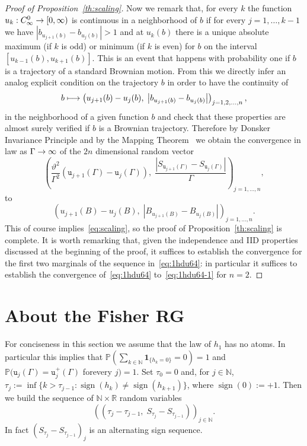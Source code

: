 \documentclass[AHL,Unicode,longabstracts,published]{cedram}
\newcommand{\ind}{\mathbf{1}}
\newcommand{\bbN}{\mathbb{N}}
\newcommand{\bbP}{\mathbb{P}}
\newcommand{\bbR}{\mathbb{R}}
\newcommand{\gG}{\Gamma}
\renewcommand*\ss{\mathtt{u}}
\newcommand{\tu}{\ss}
\newcommand{\tuplus}{\ss^+}
\DeclareMathOperator{\sign}{\mathrm{sign}}
\renewcommand*{\to}{\mathchoice{\longrightarrow}{\rightarrow}{\rightarrow}{\rightarrow}}
\let\oldmapsto\mapsto
\renewcommand*{\mapsto}{\mathchoice{\longmapsto}{\oldmapsto}{\oldmapsto}{\oldmapsto}}
\begin{document}
\begin{proof}[Proof of Proposition~\ref{th:scaling}]
Now we remark that, for every $k$ the function $u_k: C^0_\infty \to [0, \infty)$ is continuous in a neighborhood of $b$ if for every $j=1,\dots, k-1$ we have $| b_{u_{j+1}(b)}- b_{u_j (b)}| >1$ and at $u_k(b)$ there is a unique absolute maximum (if $k$ is odd) or minimum (if $k$ is even) for $b$ on the interval $[u_{k-1}(b), u_{k+1}(b)]$. This is an event that happens with probability one if $b$ is a trajectory of a standard Brownian motion. From this we directly infer an analog explicit condition on the trajectory $b$ in order to have the continuity of
\begin{equation}
b \mapsto
\left(u_{j+1}(b)-u_j(b),\; \left | b_{u_{j+1}(b)}-b_{u_{j}(b)}\right | \right)_{j=1,2, \dots, n},
\end{equation}
in the neighborhood of a given function $b$ and check that these properties are almost surely verified if $b$ is a Brownian trajectory. Therefore by {Donsker Invariance Principle} and by the {Mapping Theorem}~\cite[Theorem~2.7, Chapter~1]{cf:Bill} we obtain the convergence in law as $\gG\to \infty$ of the $2n$ dimensional random vector
\begin{equation}\label{eq:1hdu64}
\left(\frac{\vartheta^2}{ \gG ^2}\left(\tu_{j+1}(\gG) - \tu_j(\gG)\right), \;\frac{\left|S_{\tu_{j+1}(\gG)} - S_{\tu_j(\gG)}\right| }{ \gG }\right)_{j=1, \dots, n}
,
\end{equation}
to
\begin{equation}\label{eq:1hdu64-1}
\left(u_{j+1}(B)-u_j(B),\; \left|B_{u_{j+1}(B)}-B_{u_{j}(B)}\right|\right)_{j=1, \dots, n}.
\end{equation}
This of course implies~\eqref{eq:scaling}, so the proof of Proposition~\ref{th:scaling} is complete. It is worth remarking that, given the independence and IID properties discussed at the beginning of the proof, it suffices to establish the convergence for the first two marginals of the sequence in~\eqref{eq:1hdu64}: in particular it suffices to establish the convergence of~\eqref{eq:1hdu64} to~\eqref{eq:1hdu64-1} for $n=2$.
\end{proof}

\section{About the Fisher RG}\label{sec:RG}

For conciseness in this section we assume that the law of $h_1$ has no atoms. In particular this implies that $\bbP(\sum_{k\in \bbN}\ind_{\{h_k=0\}}=0)=1$ and $\bbP(\tu_j(\gG) =\tuplus_j(\gG)$ for\linebreak every $j)=1$. Set $\tau_0=0$ and, for $j \in \bbN$, $\tau_{j}:=\inf\{k> \tau_{j-1}: \sign(h_k) \neq \sign (h_{k+1})\}$, where $\sign(0):=+1$. Then we build the sequence of $\bbN \times \bbR$ random variables
\begin{equation}\label{eq:alt-signs}
\left(\left(\tau_{j}-\tau_{j-1},\; S_{\tau_{j}}-S_{\tau_{j-1}}\right)\right)_{j\in \bbN}.
\end{equation}
In fact $(S_{\tau_{j}}-S_{\tau_{j-1}})_j$ is an alternating sign sequence.
\end{document}
